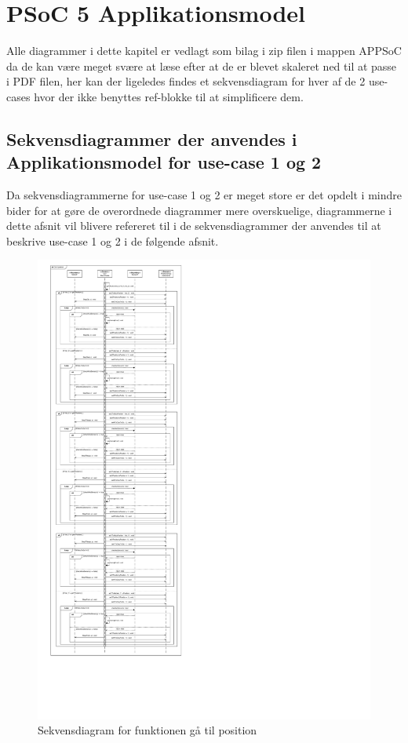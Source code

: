 \section{PSoC 5 Applikationsmodel}

Alle diagrammer i dette kapitel er vedlagt som bilag i zip filen i mappen APPSoC da de kan være meget svære at læse efter at de er blevet skaleret ned til at passe i PDF filen, her kan der ligeledes findes et sekvensdiagram for hver af de 2 use-cases hvor der ikke benyttes ref-blokke til at simplificere dem.

\subsection{Sekvensdiagrammer der anvendes i Applikationsmodel for use-case 1 og 2}

Da sekvensdiagrammerne for use-case 1 og 2 er meget store er det opdelt i mindre bider for at gøre de overordnede diagrammer mere overskuelige, diagrammerne i dette afsnit vil blivere refereret til i de sekvensdiagrammer der anvendes til at beskrive use-case 1 og 2 i de følgende afsnit.

\begin{figure}[H]
	\caption{Sekvensdiagram for funktionen gå til position}
	\label{SD:PSoC:GaaTilPos}
	\includegraphics[scale=0.29,trim=0 0 1000 0]{APPSoC/SD-Gaa-til-position-v1}
\end{figure}

